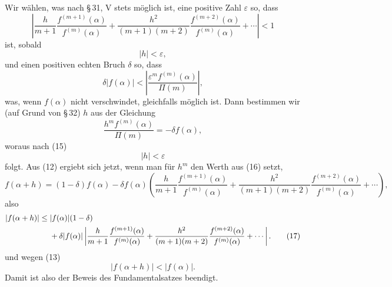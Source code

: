 \documentclass[11pt]{article}
\begin{document}
Wir wählen, was nach \S\,31, V stets möglich ist, eine positive Zahl $\varepsilon$ so, dass
\begin{equation}
\left|\frac{h}{m+1}\frac{f^{(m+1)}(\alpha)}{f^{(m)}(\alpha)}
+\frac{h^2}{(m+1)(m+2)}\frac{f^{(m+2)}(\alpha)}{f^{(m)}(\alpha)}+\cdots\right|<1
\tag{13}
\end{equation}
ist, sobald
\begin{equation}
 |h|<\varepsilon,
\tag{14}
\end{equation}
und einen positiven echten Bruch $\delta$ so, dass
\begin{equation}
 \delta |f(\alpha)|<\left|\frac{\varepsilon^m f^{(m)}(\alpha)}{\Pi(m)}\right|,
\tag{15}
\end{equation}
was, wenn $f(\alpha)$ nicht verschwindet, gleichfalls möglich ist. Dann bestimmen wir (auf Grund von \S\,32) $h$ aus der Gleichung
\begin{equation}
 \frac{h^m f^{(m)}(\alpha)}{\Pi(m)}=-\delta f(\alpha),
\tag{16}
\end{equation}
woraus nach (15)
\[
 |h|<\varepsilon
\]
folgt. Aus (12) ergiebt sich jetzt, wenn man für $h^m$ den Werth aus (16) setzt,
\[
 f(\alpha+h)=(1-\delta)f(\alpha)
 -\delta f(\alpha)\left(\frac{h}{m+1}\frac{f^{(m+1)}(\alpha)}{f^{(m)}(\alpha)}
 +\frac{h^2}{(m+1)(m+2)}\frac{f^{(m+2)}(\alpha)}{f^{(m)}(\alpha)}+\cdots\right),
\]
also
\begin{align}
 |f(\alpha+h)|\le{}& |f(\alpha)|(1-\delta)\notag\\
 &+\delta |f(\alpha)|\left|\frac{h}{m+1}\frac{f^{(m+1)}(\alpha)}{f^{(m)}(\alpha)}
 +\frac{h^2}{(m+1)(m+2)}\frac{f^{(m+2)}(\alpha)}{f^{(m)}(\alpha)}+\cdots\right|.
\tag{17}
\end{align}
und wegen (13)
\begin{equation}
 |f(\alpha+h)|<|f(\alpha)|.\tag{18}
\end{equation}
Damit ist also der Beweis des Fundamentalsatzes beendigt.
\end{document}
